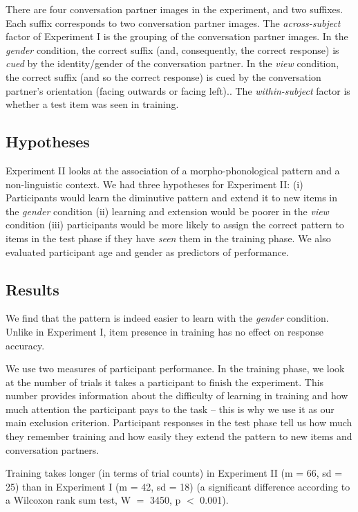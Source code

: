 \documentclass{frontiersSCNS} %
\begin{document}
There are four conversation partner images in the experiment, and two suffixes. Each suffix corresponds to two conversation partner images. The \emph{across-subject} factor of Experiment I is the grouping of the conversation partner images. In the \emph{gender} condition, the correct suffix (and, consequently, the correct response) is \emph{cued} by the identity/gender of the conversation partner. In the \emph{view} condition, the correct suffix (and so the correct response) is cued by the conversation partner's orientation (facing outwards or facing left).. The \emph{within-subject} factor is whether a test item was seen in training. 

\subsection{Hypotheses}

Experiment II looks at the association of a morpho-phonological pattern and a non-linguistic context.  We had three hypotheses for Experiment II: (i) Participants would learn the diminutive pattern and extend it to new items in the \emph{gender} condition (ii) learning and extension would be poorer in the \emph{view} condition (iii) participants would be more likely to assign the correct pattern to items in the test phase if they have \emph{seen} them in the training phase. We also evaluated participant age and gender as  predictors of performance.

\subsection{Results \label{exp2res}}

We find that the pattern is indeed easier to learn with the \emph{gender} condition. Unlike in Experiment I, item presence in training has no effect on response accuracy. 

 
We use two measures of participant performance. In the training phase, we look at the number of trials it takes a participant to finish the experiment. This number provides information about the difficulty of learning in training and how much attention the participant pays to the task -- this is why we use it as our main exclusion criterion. Participant responses in the test phase tell us how much they remember training and how easily they extend the pattern to new items and conversation partners.


Training takes longer (in terms of trial counts) in Experiment II (m = 66, sd = 25) than in Experiment I (m = 42, sd = 18) (a significant difference according to a Wilcoxon rank sum test, W $=$ 3450, p $<$ 0.001).
\end{document}
